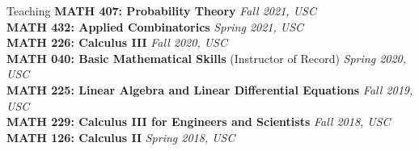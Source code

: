 \documentclass{cv} %
\begin{document}
\begin{rSection}{Teaching}
  \textbf{MATH 407: Probability Theory} \hfill \textit{Fall 2021, USC} \\
  \textbf{MATH 432: Applied Combinatorics} \hfill \textit{Spring 2021, USC} \\
  \textbf{MATH 226: Calculus III} \hfill \textit{Fall 2020, USC} \\
  \textbf{MATH 040: Basic Mathematical Skills} (Instructor of Record) \hfill \textit{Spring 2020, USC} \\
  \textbf{MATH 225: Linear Algebra and Linear Differential Equations} \hfill \textit{Fall 2019, USC} \\
  \textbf{MATH 229: Calculus III for Engineers and Scientists} \hfill \textit{Fall 2018, USC} \\
  \textbf{MATH 126: Calculus II} \hfill \textit{Spring 2018, USC}
\end{rSection}
\end{document}
